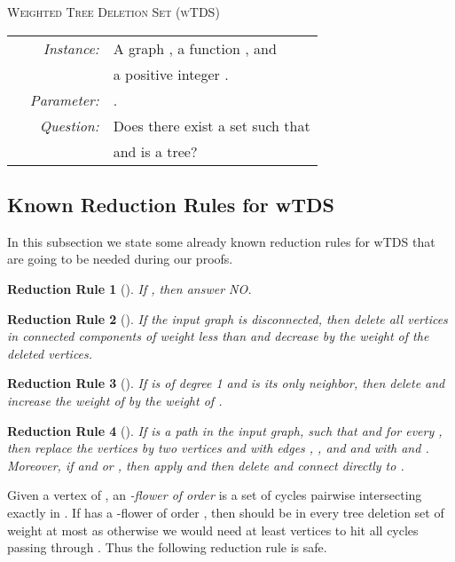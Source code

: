 \documentclass[a4paper,11pt]{article}
\newtheorem{rrule}{Reduction Rule}
\begin{document}
\begin{center}
\begin{boxedminipage}{.99\textwidth}

\textsc{Weighted Tree Deletion Set  ({\sc wTDS})}

\begin{tabular}{ r l }
\textit{~~~~Instance:} & A graph , a function , and\\
& a positive integer . \\
\textit{Parameter:} & .\\
\textit{Question:} & Does there exist a set  such that\\ 
&  and  is a tree? \\
\end{tabular}
\end{boxedminipage}
\end{center}

\subsection{Known Reduction Rules for {\sc wTDS}}

In this subsection we state some already known reduction rules for  {\sc wTDS} that are going to be needed during our proofs.

\begin{rrule}[\cite{RamanSS13}]\label{rrule1}
If , then answer NO.
\end{rrule}

\begin{rrule}[\cite{RamanSS13}]
If the input graph is disconnected, then delete all vertices in connected components of weight less than  
and decrease  by the weight of the deleted vertices.
\end{rrule}

\begin{rrule}[\cite{RamanSS13}]\label{rrule3}
If  is of degree 1 and  is its only neighbor, then delete  and increase the weight of  by the weight of .
\end{rrule}

\begin{rrule}[\cite{RamanSS13}]\label{rrule4}
If  is a path in the input graph, such that  and  for every , then 
 replace the vertices  by two vertices  and  with edges , , 
and  and with  and .
Moreover, if  and  or , then apply  and then  delete  and connect 
 directly to .
\end{rrule}

Given a vertex  of , an {\em -flower of order } is a set of cycles pairwise intersecting exactly in .
If  has a -flower of order , then  should be in every tree deletion set of weight at most  as otherwise we would need at least 
vertices to hit all cycles passing through .
Thus the following reduction rule is safe.
\end{document}
